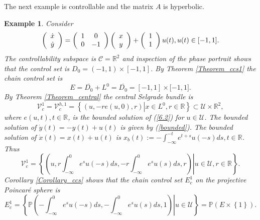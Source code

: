 \documentclass{siamltex}%
\newtheorem{example}[theorem]{Example}
\begin{document}
The next example is controllable and the matrix $A$ is hyperbolic.

\begin{example}
Consider%
\begin{equation}
\left(
\begin{array}
[c]{c}%
\dot{x}\\
\dot{y}%
\end{array}
\right)  =\left(
\begin{array}
[c]{cc}%
1 & 0\\
0 & -1
\end{array}
\right)  \left(
\begin{array}
[c]{c}%
x\\
y
\end{array}
\right)  +\left(
\begin{array}
[c]{c}%
1\\
1
\end{array}
\right)  u(t),u(t)\in\lbrack-1,1]. \label{6.2}%
\end{equation}
The controllability subspace is $\mathcal{C}=\mathbb{R}^{2}$ and inspection of
the phase portrait shows that the control set is $D_{0}=\left(  -1,1\right)
\times\left[  -1,1\right]  $. By Theorem \ref{Theorem_ccs1} the chain control
set is%
\[
E=\overline{D_{0}}+L^{0}=\overline{D_{0}}=[-1,1]\times\lbrack-1,1].
\]
By Theorem \ref{Theorem_central} the central Selgrade bundle is%
\[
\mathcal{V}_{c}^{1}=\mathcal{V}_{c}^{h,1}=\left\{  (u,-re(u,0),r)\left\vert
x\in L^{0},r\in\mathbb{R}\right.  \right\}  \subset\mathcal{U}\times
\mathbb{R}^{2},
\]
where $e(u,t),t\in\mathbb{R}$, is the bounded solution of (\ref{6.2}) for
$u\in\mathcal{U}$. The bounded solution of $\dot{y}(t)=-y(t)+u(t)$ is given by
(\ref{bounded}). The bounded solution of $\dot{x}(t)=x(t)+u(t)$ is
$x_{b}(t):=-\int_{-\infty}^{-t}e^{t+s}u(-s)ds,t\in\mathbb{R}$. Thus
\[
\mathcal{V}_{c}^{1}=\left\{  \left.  \left(  u,r\int_{-\infty}^{0}%
e^{s}u(-s)ds,-r\int_{-\infty}^{0}e^{s}u(s)ds,r\right)  \right\vert
u\in\mathcal{U},r\in\mathbb{R}\right\}  .
\]
Corollary \ref{Corollary_ccs} shows that the chain control set $E_{c}^{1}$ on
the projective Poincar\'{e} sphere is%
\[
E_{c}^{1}=\left\{  \mathbb{P}\left.  \left(  -\int_{-\infty}^{0}%
e^{s}u(-s)ds,-\int_{-\infty}^{0}e^{s}u(s)ds,1\right)  \right\vert
u\in\mathcal{U}\right\}  =\mathbb{P}\left(  E\times\left\{  1\right\}
\right)  .
\]
\bigskip
\end{example}
\end{document}
